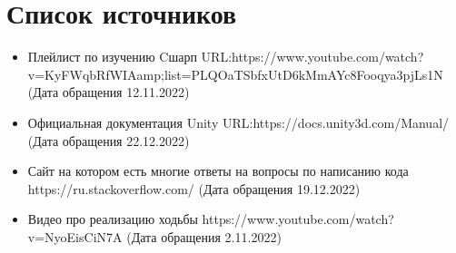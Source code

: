 \newpage
\section{Список источников}
\begin{itemize}
\item Плейлист по изучению Cшарп URL:https://www.youtube.com/watch?v=KyFWqbRfWIAamp;list=PLQOaTSbfxUtD6kMmAYc8Fooqya3pjLs1N (Дата обращения 12.11.2022)
\item  Официальная документация Unity URL:https://docs.unity3d.com/Manual/
(Дата обращения 22.12.2022)
\item Сайт на котором есть многие ответы на вопросы по написанию кода
https://ru.stackoverflow.com/ (Дата обращения 19.12.2022)
\item Видео про реализацию ходьбы
https://www.youtube.com/watch?v=NyoEisCiN7A (Дата обращения
2.11.2022)
\end{itemize}

